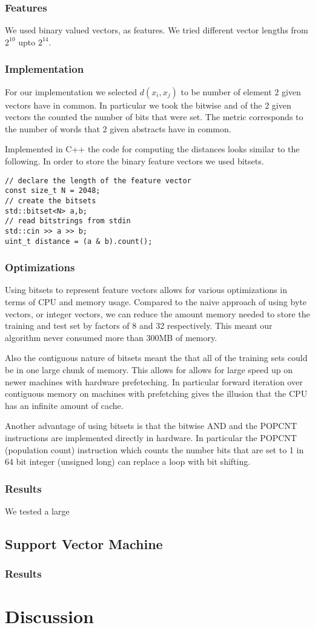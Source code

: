 \documentclass[10pt,twocolumn]{article}
\begin{document}
\subsubsection{Features}
We used binary valued vectors, as features. We tried different vector lengths from $2^{10}$ upto $2^{14}$.
\subsubsection{Implementation}
For our implementation we selected $d(x_i,x_j)$ to be number of element 2 given vectors have in common. In particular we took the bitwise and of the 2 given vectors the counted the number of bits that were set. The metric corresponds to the number of words that 2 given abstracts have in common. 

Implemented in C++ the code for computing the distances looks similar to the following. In order to store the binary feature vectors we used bitsets.

\begin{lstlisting}
// declare the length of the feature vector
const size_t N = 2048;
// create the bitsets
std::bitset<N> a,b;
// read bitstrings from stdin
std::cin >> a >> b; 
uint_t distance = (a & b).count();
\end{lstlisting}
\subsubsection{Optimizations}
Using bitsets to represent feature vectors allows for various optimizations in terms of CPU and memory usage. Compared to the naive approach of using byte vectors, or integer vectors, we can reduce the amount memory needed to store the training and test set by factors of 8 and 32 respectively. This meant our algorithm never consumed more than 300MB of memory. 

Also the contiguous nature of bitsets meant the that all of the training sets could be in one large chunk of memory. This allows for allows for large speed up on newer machines with hardware prefeteching. In particular forward iteration over contiguous memory on machines with prefetching gives the illusion that the CPU has an infinite amount of cache.

Another advantage of using bitsets is that the bitwise AND and the POPCNT instructions are implemented directly in hardware. In particular the POPCNT (population count) instruction which counts the number bits that are set to 1 in 64 bit integer (unsigned long) can replace a loop with bit shifting.
\subsubsection{Results}
We tested a large
\subsection{Support Vector Machine}
\subsubsection{Results}
\section{Discussion}
\end{document}
